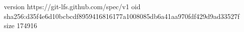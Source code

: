 version https://git-lfs.github.com/spec/v1
oid sha256:d35f4e6d10bcbcdf8959416816177a1008085db6a41aa970fdf429d9ad33527f
size 174916
